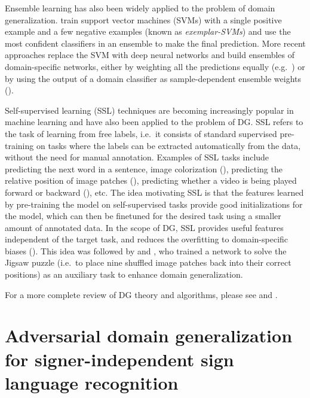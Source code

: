 Ensemble learning has also been widely applied to the problem of domain generalization. \citet{Zheng2014} train support vector machines (SVMs) with a single positive example and a few negative examples (known as \emph{exemplar-SVMs}) and use the most confident classifiers in an ensemble to make the final prediction. More recent approaches replace the SVM with deep neural networks and build ensembles of domain-specific networks, either by weighting all the predictions equally (e.g.\ \citet{Innocente2018, Zhou2020}) or by using the output of a domain classifier as sample-dependent ensemble weights (\citet{Wang2020a}).

Self-supervised learning (SSL) techniques are becoming increasingly popular in machine learning and have also been applied to the problem of DG. SSL refers to the task of learning from free labels, i.e.\ it consists of standard supervised pre-training on tasks where the labels can be extracted automatically from the data, without the need for manual annotation. Examples of SSL tasks include predicting the next word in a sentence, image colorization (\citet{Zhang2016}), predicting the relative position of image patches (\citet{Doersch2015}), predicting whether a video is being played forward or backward (\citet{Wei2018}), etc. The idea motivating SSL is that the features learned by pre-training the model on self-supervised tasks provide good initializations for the model, which can then be finetuned for the desired task using a smaller amount of annotated data. In the scope of DG, SSL provides useful features independent of the target task, and reduces the overfitting to domain-specific biases (\citet{Zhou2021}). This idea was followed by \citet{Carlucci2019} and \citet{Wang2020b}, who trained a network to solve the Jigsaw puzzle (i.e.\ to place nine shuffled image patches back into their correct positions) as an auxiliary task to enhance domain generalization.

For a more complete review of DG theory and algorithms, please see \citet{Wang2021} and \citet{Zhou2021}.

\section{Adversarial domain generalization for signer-independent sign language recognition}
\label{sec:adv_signer_inv}

